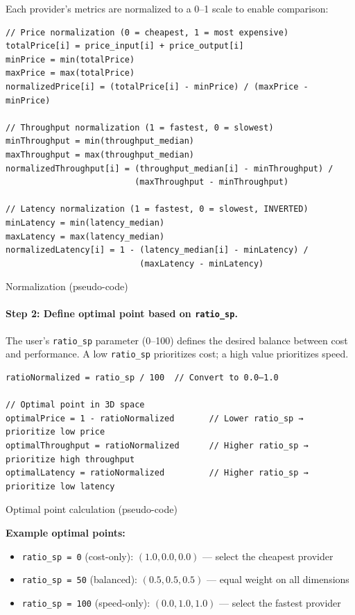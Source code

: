 \documentclass[english]{article}
\begin{document}
Each provider's metrics are normalized to a 0–1 scale to enable comparison:

\begin{listing}[H]
\begin{verbatim}
// Price normalization (0 = cheapest, 1 = most expensive)
totalPrice[i] = price_input[i] + price_output[i]
minPrice = min(totalPrice)
maxPrice = max(totalPrice)
normalizedPrice[i] = (totalPrice[i] - minPrice) / (maxPrice - minPrice)

// Throughput normalization (1 = fastest, 0 = slowest)
minThroughput = min(throughput_median)
maxThroughput = max(throughput_median)
normalizedThroughput[i] = (throughput_median[i] - minThroughput) /
                          (maxThroughput - minThroughput)

// Latency normalization (1 = fastest, 0 = slowest, INVERTED)
minLatency = min(latency_median)
maxLatency = max(latency_median)
normalizedLatency[i] = 1 - (latency_median[i] - minLatency) /
                           (maxLatency - minLatency)
\end{verbatim}
\caption{Normalization (pseudo-code)}
\end{listing}

\paragraph{Step 2: Define optimal point based on \texttt{ratio\_sp}.}

The user's \texttt{ratio\_sp} parameter (0–100) defines the desired balance between cost and performance. A low \texttt{ratio\_sp} prioritizes cost; a high value prioritizes speed.

\begin{listing}[H]
\begin{verbatim}
ratioNormalized = ratio_sp / 100  // Convert to 0.0–1.0

// Optimal point in 3D space
optimalPrice = 1 - ratioNormalized       // Lower ratio_sp → prioritize low price
optimalThroughput = ratioNormalized      // Higher ratio_sp → prioritize high throughput
optimalLatency = ratioNormalized         // Higher ratio_sp → prioritize low latency
\end{verbatim}
\caption{Optimal point calculation (pseudo-code)}
\end{listing}

\textbf{Example optimal points:}
\begin{itemize}
    \item \texttt{ratio\_sp = 0} (cost-only): $(1.0, 0.0, 0.0)$ — select the cheapest provider
    \item \texttt{ratio\_sp = 50} (balanced): $(0.5, 0.5, 0.5)$ — equal weight on all dimensions
    \item \texttt{ratio\_sp = 100} (speed-only): $(0.0, 1.0, 1.0)$ — select the fastest provider
\end{itemize}
\end{document}
